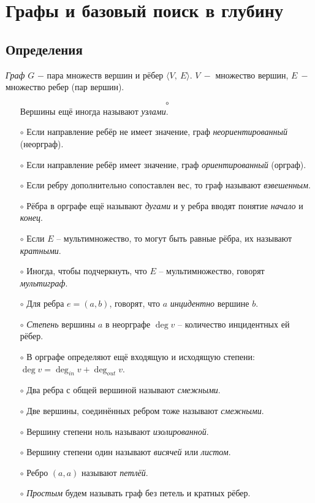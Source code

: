 \section{Графы и базовый поиск в глубину}
\subsection{Определения}

\begin{definition}
    \textit{Граф} $G$ $-$ пара множеств вершин и рёбер $\langle V,\ E\rangle$. $V\ -$ множество вершин, $E\ -$ множество ребер (пар вершин).
\end{definition}

\begin{enumerate}
    \item[$$\circ$$] Вершины ещё иногда называют \textit{узлами}.
    \item[$\circ$] Если направление ребёр не имеет значение, граф \textit{неориентированный} (неорграф).
    \item[$\circ$] Если направление ребёр имеет значение, граф \textit{ориентированный} (орграф).
    \item[$\circ$] Если ребру дополнительно сопоставлен вес, то граф называют \textit{взвешенным}.
    \item[$\circ$] Рёбра в орграфе ещё называют \textit{дугами} и у ребра вводят понятие \textit{начало} и \textit{конец}.
    \item[$\circ$] Если $E$ – мультимножество, то могут быть равные рёбра, их называют \textit{кратными}.
    \item[$\circ$] Иногда, чтобы подчеркнуть, что $E$ – мультимножество, говорят \textit{мультиграф}.
    \item[$\circ$] Для ребра $e = (a,b)$, говорят, что $a$ \textit{инцидентно} вершине $b$.
    \item[$\circ$] \textit{Степень} вершины $a$ в неорграфе $\deg v$ – количество инцидентных ей рёбер.
    \item[$\circ$] В орграфе определяют ещё входящую и исходящую степени: $\deg v=\deg_{in} v + \deg_{out} v$.
    \item[$\circ$] Два ребра с общей вершиной называют \textit{смежными}.
    \item[$\circ$] Две вершины, соединённых ребром тоже называют \textit{смежными}.
    \item[$\circ$] Вершину степени ноль называют \textit{изолированной}.
    \item[$\circ$] Вершину степени один называют \textit{висячей} или \textit{листом}.
    \item[$\circ$] Ребро $(a,a)$ называют \textit{петлёй}.
    \item[$\circ$] \textit{Простым} будем называть граф без петель и кратных рёбер.
\end{enumerate}

